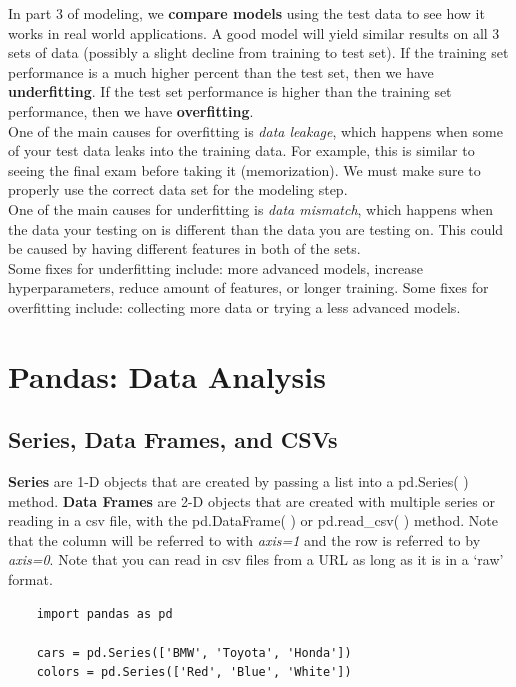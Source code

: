 \documentclass[11pt, a4paper]{article}
\begin{document}
\begin{spacing}{1.1}
	\noindent In part 3 of modeling, we \textbf{compare models} using the test data to see how it works in real world applications. A good model will yield similar results on all 3 sets of data (possibly a slight decline from training to test set). If the training set performance is a much higher percent than the test set, then we have \textbf{underfitting}. If the test set performance is higher than the training set performance, then we have \textbf{overfitting}. \vspace*{2mm} \\
	One of the main causes for overfitting is \textit{data leakage}, which happens when some of your test data leaks into the training data. For example, this is similar to seeing the final exam before taking it (memorization). We must make sure to properly use the correct data set for the modeling step. \vspace*{2mm} \\
	One of the main causes for underfitting is \textit{data mismatch}, which happens when the data your testing on is different than the data you are testing on. This could be caused by having different features in both of the sets. \vspace*{2mm} \\
	Some fixes for underfitting include: more advanced models, increase hyperparameters, reduce amount of features, or longer training. Some fixes for overfitting include: collecting more data or trying a less advanced models. \\
	
	\section{Pandas: Data Analysis}
	\subsection{Series, Data Frames, and CSVs}
	\textbf{Series} are 1-D objects that are created by passing a list into a pd.Series( ) method. \textbf{Data Frames} are 2-D objects that are created with multiple series or reading in a csv file, with the pd.DataFrame( ) or pd.read\_csv( ) method. Note that the column will be referred to with \textit{axis=1} and the row is referred to by \textit{axis=0}. Note that you can read in csv files from a URL as long as it is in a `raw' format. 
	\begin{lstlisting}
	import pandas as pd
	
	cars = pd.Series(['BMW', 'Toyota', 'Honda'])
	colors = pd.Series(['Red', 'Blue', 'White'])
	

\end{lstlisting}
\end{spacing}
\end{document}

